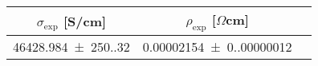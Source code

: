 \begin{tabular}{ccc}
\toprule
$\sigma_{\exp}$ [S/cm] & $\rho_{\exp}$ [$\Omega$cm] \\
\midrule
\num{46428.984(250.320)} & \num{0.00002154(0.00000012)} \\
\bottomrule
\end{tabular}
